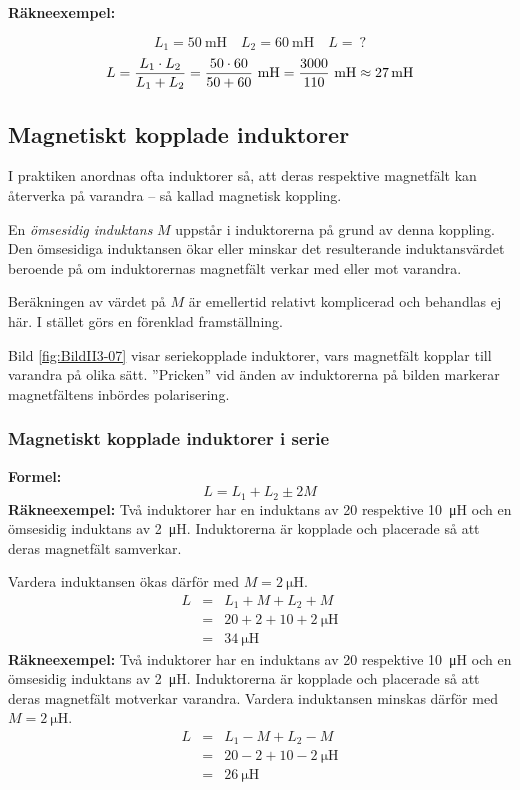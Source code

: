 \textbf{Räkneexempel:}

\[L_1 = \SI{50}{\milli\henry} \quad L_2 = \SI{60}{\milli\henry} \quad L =\ ?\]
\[
  L = \frac{L_1 \cdot L_2}{L_1 + L_2} \\
  = \frac{50 \cdot 60}{50 + 60}\ \si{\milli\henry} \\
  = \frac{3000}{110}\ \si{\milli\henry} \\
  \approx \SI{27}{\milli\henry}
\]

\subsection{Magnetiskt kopplade induktorer}


I praktiken anordnas ofta induktorer så, att deras respektive magnetfält kan
återverka på varandra -- så kallad magnetisk koppling.

En \emph{ömsesidig induktans} \(M\) uppstår i induktorerna på grund av denna
koppling.
Den ömsesidiga induktansen ökar eller minskar det resulterande induktansvärdet
beroende på om induktorernas magnetfält verkar med eller mot varandra.

Beräkningen av värdet på \(M\) är emellertid relativt komplicerad och behandlas
ej här.
I stället görs en förenklad framställning.

Bild \ref{fig:BildII3-07} visar seriekopplade induktorer, vars magnetfält
kopplar till varandra på olika sätt.
''Pricken'' vid änden av induktorerna på bilden markerar magnetfältens inbördes polarisering.

\subsubsection{Magnetiskt kopplade induktorer i serie}

\textbf{Formel:}
%
\[L = L_1 +L_2 \pm 2M\]
%
\textbf{Räkneexempel:}
Två induktorer har en induktans av 20 respektive \SI{10}{\micro\henry} och en
ömsesidig induktans av \SI{2}{\micro\henry}.
Induktorerna är kopplade och placerade så att deras magnetfält samverkar.

Vardera induktansen ökas därför med \(M = \SI{2}{\micro\henry}\).
\[
\begin{array}{rcl}
  L &=& L_1 + M + L_2 + M \\
    &=& 20 + 2 + 10 + \SI{2}{\micro\henry} \\
    &=& \SI{34}{\micro\henry}
\end{array}
\]
\textbf{Räkneexempel:}
Två induktorer har en induktans av 20 respektive \SI{10}{\micro\henry} och en
ömsesidig induktans av \SI{2}{\micro\henry}.
Induktorerna är kopplade och placerade så att deras magnetfält motverkar varandra.
Vardera induktansen minskas därför med \(M = \SI{2}{\micro\henry}\).
\[
\begin{array}{rcl}
  L &=& L_1 - M + L_2 - M \\
    &=& 20 - 2 + 10 - \SI{2}{\micro\henry} \\
    &=& \SI{26}{\micro\henry}
\end{array}
\]
